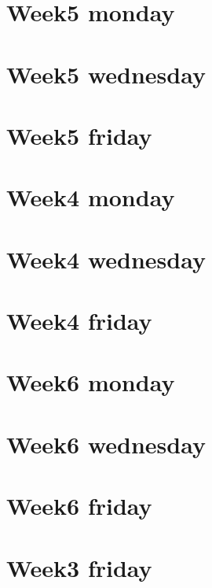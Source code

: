 
\section*{Week5 monday}

\vfill
\section*{Week5 wednesday}

\vfill
\section*{Week5 friday}

\vfill
\section*{Week4 monday}

\vfill
\section*{Week4 wednesday}

\vfill
\section*{Week4 friday}

\vfill
\section*{Week6 monday}

\vfill
\section*{Week6 wednesday}

\vfill
\section*{Week6 friday}

\vfill
\section*{Week3 friday}

\vfill
